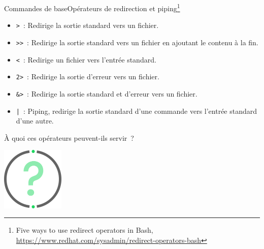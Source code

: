 \documentclass{beamer}
\begin{document}
    \begin{frame}{Commandes de base}{Opérateurs de redirection et piping\footnote{Five ways to use redirect operators in Bash, \url{https://www.redhat.com/sysadmin/redirect-operators-bash}}}
        \begin{footnotesize}
            \begin{itemize}
                \item \lstinline{>}~: Redirige la sortie standard vers un fichier.
                \item \lstinline{>>}~: Redirige la sortie standard vers un fichier en ajoutant le contenu à la fin.
                \item \lstinline{<}~: Redirige un fichier vers l'entrée standard.
                \item \lstinline{2>}~: Redirige la sortie d'erreur vers un fichier.
                \item \lstinline{&>}~: Redirige la sortie standard et d'erreur vers un fichier.
                \item \lstinline{|}~: Piping, redirige la sortie standard d'une commande vers l'entrée standard d'une autre.
            \end{itemize}
            À quoi ces opérateurs peuvent-ils servir~?
            \begin{center}
                \includegraphics[width=3cm]{image/question-mark}
            \end{center}
        \end{footnotesize}
    \end{frame}
\end{document}
